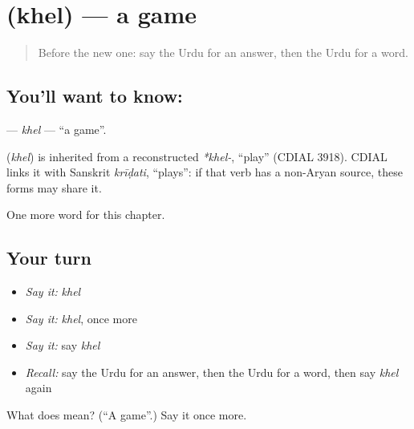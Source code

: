 \section[\texorpdfstring{\ur{کھیل} (khel)}{کھیل (khel)}]{ (khel) — a game}

\label{lesson:UR-C63-khel}



\begin{quote}
Before the new one: say the Urdu for an answer, then the Urdu for a word.
\end{quote}

\subsection*{You'll want to know: }
\textbf{} — \emph{khel} — \textquotedblleft{}a game\textquotedblright{}.

\begin{cousinweb}
\textbf{} (\emph{khel}) is inherited from a reconstructed \emph{*khel-}, \textquotedblleft{}play\textquotedblright{} (CDIAL 3918). CDIAL links it with Sanskrit \emph{krīḍati}, \textquotedblleft{}plays\textquotedblright{}: if that verb has a non-Aryan source, these forms may share it.
\end{cousinweb}

\begin{grammarlens}[title={What you've built}]
One more word for this chapter.
\end{grammarlens}

\subsection*{Your turn}
\begin{itemize}
\raggedright
  \item \emph{Say it:} \emph{khel}
  \item \emph{Say it:} \emph{khel}, once more
  \item \emph{Say it:} say \emph{khel}
  \item \emph{Recall:} say the Urdu for an answer, then the Urdu for a word, then say \emph{khel} again
\end{itemize}

\begin{tcolorbox}[breakable,colback=teal!4,colframe=teal!35!black,title={Before you move on}]
What does  mean? (\textquotedblleft{}A game\textquotedblright{}.) Say it once more.
\end{tcolorbox}
